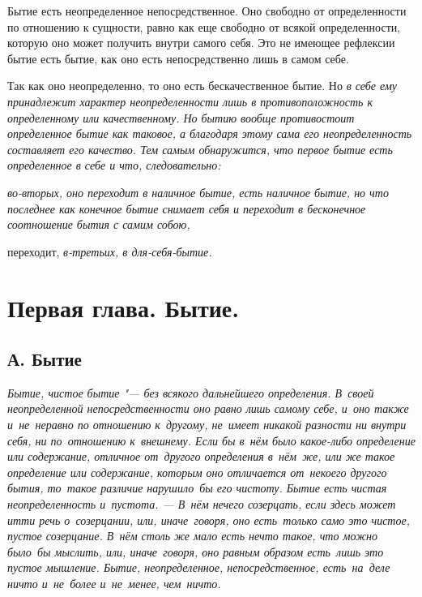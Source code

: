 Бытие есть неопределенное непосредственное. Оно свободно от определенности
по отношению к сущности, равно как еще свободно от всякой определенности,
которую оно может получить внутри самого себя. Это не имеющее рефлексии
бытие есть бытие, как оно есть непосредственно лишь в самом себе.

Так как оно неопределенно, то оно есть бескачественное бытие. Но
\em{в себе} ему принадлежит характер неопределенности
лишь в противоположность к \em{определенному} или
качественному. Но бытию вообще противостоит
\em{определенное} бытие как таковое, а благодаря этому
сама его неопределенность составляет его качество. Тем самым обнаружится,
что \em{первое} бытие есть определенное в себе и что,
следовательно:

\em{во-вторых}, оно переходит в
\em{наличное бытие}, есть
\em{наличное бытие}, но что последнее как конечное
бытие снимает себя и переходит в бесконечное соотношение бытия с самим
собою,

переходит, \em{в-третьих}, в
\em{для-себя-бытие}.

\chapter*{Первая глава. Бытие.}
\section*{А. Бытие}

\em{Бытие}, \em{чистое бытие} "--- без всякого дальнейшего определения.
В~своей неопределенной непосредственности оно равно лишь
самому себе, и~оно также и~не~неравно по отношению к~другому, не~имеет
никакой разности ни внутри себя, ни по~отношению к~внешнему. Если бы
в~нём было какое-либо определение или
содержание, отличное от~другого определения в~нём~же, или же такое
определение или содержание, которым оно отличается от~некоего другого
бытия, то~такое различие нарушило~бы его чистоту. Бытие есть чистая
неопределенность и~пустота. --- В~нём нечего созерцать, если здесь
может итти речь о~созерцании, или, иначе~говоря, оно есть~только само
это чистое, пустое созерцание.
В~нём столь же мало есть нечто такое, что можно было~бы
мыслить, или, иначе~говоря, оно равным образом есть~лишь это пустое
мышление. Бытие, неопределенное, непосредственное, есть~на~деле
\em{ничто} и~не~более и~не~менее, чем~ничто.

